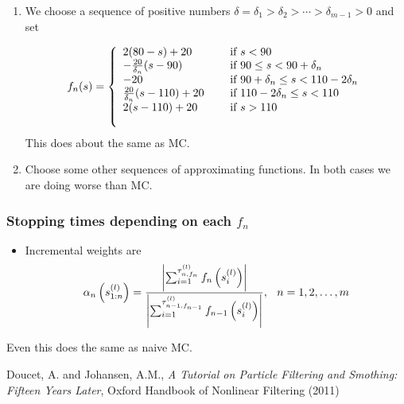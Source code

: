 \documentclass{article}
\begin{document}
\begin{enumerate}

\item We choose a sequence of positive numbers $\delta = \delta_{1} > \delta_{2} > \cdots > \delta_{m-1} > 0$ and set

\[f_{n}(s) = \left\{ 
\begin{array}{l l}
2(80-s) + 20                                     & \quad \text{ if } s < 90 \\
- \frac{20}{\delta_{n}} (s-90)           & \quad \text{ if } 90 \leq s < 90 + \delta_{n} \\
-20                                                   & \quad \text{ if } 90 + \delta_{n} \leq s < 110 - 2\delta_{n} \\
\frac{20}{\delta_{n}}(s - 110) + 20  & \quad \text{ if } 110 - 2 \delta_{n} \leq s < 110 \\
2(s-110) + 20                                   & \quad \text{ if } s > 110 \\
\\
  \end{array} \right.\]
This does about the same as MC.

\item Choose some other sequences of approximating functions. In both cases we are doing worse than MC. 

\end{enumerate} 

\subsubsection{Stopping times depending on each $f_{n}$}

\begin{itemize}

\item Incremental weights are
$$ \alpha_{n} \left (s_{1:n}^{(l)} \right ) = \frac{ \left | \sum_{i=1}^{\tau_{n,f_{n}}^{(l)}} f_{n} \left (s_{i}^{(l)} \right ) \right | } { \left | \sum_{i=1}^{\tau_{n-1,f_{n-1}}^{(l)}} f_{n-1} \left ( s_{i}^{(l)} \right) \right | }, \hspace{0.1in} n = 1, 2, \ldots, m $$
\end{itemize}

Even this does the same as naive MC.


\begin{thebibliography}{45}

Doucet, A. and Johansen, A.M.,
  \emph{A Tutorial on Particle Filtering and Smothing: Fifteen Years Later},
  Oxford Handbook of Nonlinear Filtering (2011)

\end{thebibliography}
\end{document}
